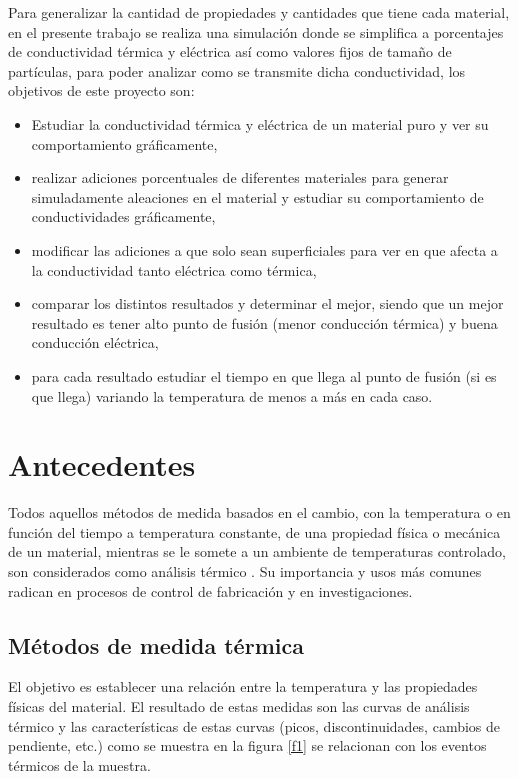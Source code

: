 \documentclass[3pt,twocolumn]{elsarticle}
\begin{document}
Para generalizar la cantidad de propiedades y cantidades que tiene cada material, en el presente trabajo se realiza una simulación donde se simplifica a porcentajes de conductividad térmica y eléctrica así como valores fijos de tamaño de partículas, para poder analizar como se transmite dicha conductividad, los objetivos de este proyecto son:

\begin{itemize}
    \item Estudiar la conductividad térmica y eléctrica de un material puro y ver su comportamiento gráficamente,
    \item realizar adiciones porcentuales de diferentes materiales para generar simuladamente aleaciones en el material y estudiar su comportamiento de conductividades gráficamente, 
    \item modificar las adiciones a que solo sean superficiales para ver en que afecta a la conductividad tanto eléctrica como térmica,
    \item comparar los distintos resultados y determinar el mejor, siendo que un mejor resultado es tener alto punto de fusión (menor conducción térmica) y buena conducción eléctrica,
    \item para cada resultado estudiar el tiempo en que llega al punto de fusión (si es que llega) variando la temperatura de menos a más en cada caso.
\end{itemize}

\section{Antecedentes}\label{antesc}
Todos aquellos métodos de medida basados en el cambio, con la temperatura o en función del tiempo a temperatura constante, de una propiedad física o mecánica de un material, mientras se le somete a un ambiente de temperaturas controlado, son considerados como análisis térmico \cite{book1}. 
Su importancia y usos más comunes radican en procesos de control de fabricación y en investigaciones.
\subsection{Métodos de medida térmica}
 El objetivo es establecer una relación entre la temperatura y las propiedades físicas del material. El resultado de estas medidas son las curvas de análisis térmico y las características de estas curvas (picos, discontinuidades, cambios de pendiente, etc.) como se muestra en la figura \ref{f1} se relacionan con los eventos térmicos de la muestra.
\end{document}
